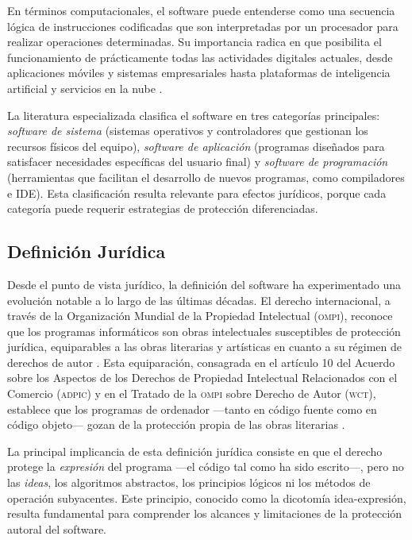 \documentclass[11pt,a4paper]{report}
\begin{document}
En términos computacionales, el software puede entenderse como una secuencia lógica de instrucciones codificadas que son interpretadas por un procesador para realizar operaciones determinadas. Su importancia radica en que posibilita el funcionamiento de prácticamente todas las actividades digitales actuales, desde aplicaciones móviles y sistemas empresariales hasta plataformas de inteligencia artificial y servicios en la nube \citep{euipo2022}.

La literatura especializada clasifica el software en tres categorías principales: \textit{software de sistema} (sistemas operativos y controladores que gestionan los recursos físicos del equipo), \textit{software de aplicación} (programas diseñados para satisfacer necesidades específicas del usuario final) y \textit{software de programación} (herramientas que facilitan el desarrollo de nuevos programas, como compiladores e IDE). Esta clasificación resulta relevante para efectos jurídicos, porque cada categoría puede requerir estrategias de protección diferenciadas.

\subsection{Definición Jurídica}

Desde el punto de vista jurídico, la definición del software ha experimentado una evolución notable a lo largo de las últimas décadas. El derecho internacional, a través de la Organización Mundial de la Propiedad Intelectual (\textsc{ompi}), reconoce que los programas informáticos son obras intelectuales susceptibles de protección jurídica, equiparables a las obras literarias y artísticas en cuanto a su régimen de derechos de autor \citep{ompi2024}. Esta equiparación, consagrada en el artículo 10 del Acuerdo sobre los Aspectos de los Derechos de Propiedad Intelectual Relacionados con el Comercio (\textsc{adpic}) y en el Tratado de la \textsc{ompi} sobre Derecho de Autor (\textsc{wct}), establece que los programas de ordenador —tanto en código fuente como en código objeto— gozan de la protección propia de las obras literarias \citep{omc1994, ompi1996}.

La principal implicancia de esta definición jurídica consiste en que el derecho protege la \emph{expresión} del programa —el código tal como ha sido escrito—, pero no las \emph{ideas}, los algoritmos abstractos, los principios lógicos ni los métodos de operación subyacentes. Este principio, conocido como la dicotomía idea-expresión, resulta fundamental para comprender los alcances y limitaciones de la protección autoral del software.
\end{document}
